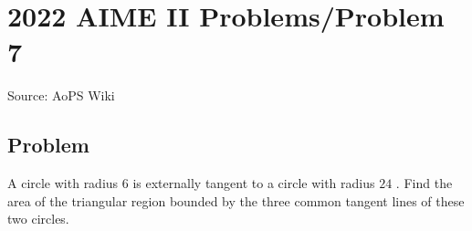 \documentclass[12pt]{article}
\begin{document}
\section*{{2022 AIME II Problems/Problem 7}}
Source: AoPS Wiki

\subsection*{Problem}
A circle with radius $6$ is externally tangent to a circle with radius $24$ . Find the area of the triangular region bounded by the three common tangent lines of these two circles.
\end{document}
